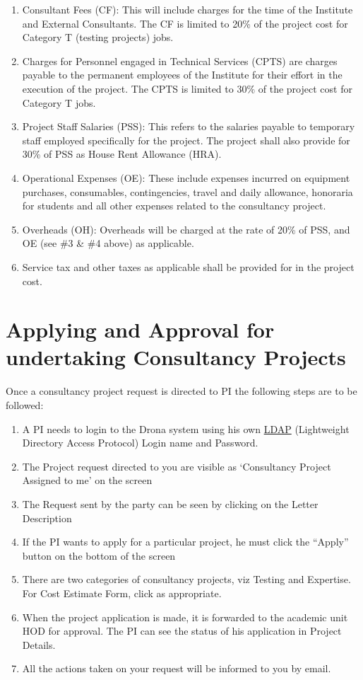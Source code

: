 \documentclass[
  10pt,
  a5paper,
  10pt,
  openany]{amsbook}
\providecommand{\tightlist}{%
  \setlength{\itemsep}{0pt}\setlength{\parskip}{0pt}}
\begin{document}
\begin{enumerate}
\def\labelenumi{\arabic{enumi}.}
\tightlist
\item
  Consultant Fees (CF): This will include charges for the time of the
  Institute and External Consultants. The CF is limited to 20\% of the
  project cost for Category T (testing projects) jobs.
\item
  Charges for Personnel engaged in Technical Services (CPTS) are charges
  payable to the permanent employees of the Institute for their effort
  in the execution of the project. The CPTS is limited to 30\% of the
  project cost for Category T jobs.
\item
  Project Staff Salaries (PSS): This refers to the salaries payable to
  temporary staff employed specifically for the project. The project
  shall also provide for 30\% of PSS as House Rent Allowance (HRA).
\item
  Operational Expenses (OE): These include expenses incurred on
  equipment purchases, consumables, contingencies, travel and daily
  allowance, honoraria for students and all other expenses related to
  the consultancy project.
\item
  Overheads (OH): Overheads will be charged at the rate of 20\% of PSS,
  and OE (see \#3 \& \#4 above) as applicable.
\item
  Service tax and other taxes as applicable shall be provided for in the
  project cost.
\end{enumerate}

\section{Applying and Approval for undertaking Consultancy
Projects}\label{applying-and-approval-for-undertaking-consultancy-projects}

Once a consultancy project request is directed to PI the following steps
are to be followed:

\begin{enumerate}
\def\labelenumi{\arabic{enumi}.}
\item
  A PI needs to login to the Drona system using his own
  \href{http://drona.ircc.iitb.ac.in/}{LDAP} (Lightweight Directory
  Access Protocol) Login name and Password.
\item
  The Project request directed to you are visible as `Consultancy
  Project Assigned to me' on the screen
\item
  The Request sent by the party can be seen by clicking on the Letter
  Description
\item
  If the PI wants to apply for a particular project, he must click the
  ``Apply'' button on the bottom of the screen
\item
  There are two categories of consultancy projects, viz Testing and
  Expertise. For Cost Estimate Form, click as appropriate.
\item
  When the project application is made, it is forwarded to the academic
  unit HOD for approval. The PI can see the status of his application in
  Project Details.
\item
  All the actions taken on your request will be informed to you by
  email.
\end{enumerate}
\end{document}
